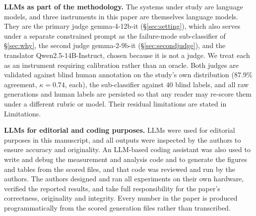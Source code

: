 \documentclass[conference,compsoc,letterpaper]{IEEEtran}
\begin{document}
\textbf{LLMs as part of the methodology.} The systems under study are language models, and three instruments in this paper are themselves language models. They are the primary judge gemma-4-12b-it (\S\ref{sec:setting}), which also serves under a separate constrained prompt as the failure-mode sub-classifier of \S\ref{sec:why}, the second judge gemma-2-9b-it (\S\ref{sec:secondjudge}), and the translator Qwen2.5-14B-Instruct, chosen because it is not a judge. We treat each as an instrument requiring calibration rather than an oracle. Both judges are validated against blind human annotation on the study's own distribution ($87.9\%$ agreement, $\kappa = 0.74$, each), the sub-classifier against $40$ blind labels, and all raw generations and human labels are persisted so that any reader may re-score them under a different rubric or model. Their residual limitations are stated in Limitations.

\textbf{LLMs for editorial and coding purposes.} LLMs were used for editorial purposes in this manuscript, and all outputs were inspected by the authors to ensure accuracy and originality. An LLM-based coding assistant was also used to write and debug the measurement and analysis code and to generate the figures and tables from the scored files, and that code was reviewed and run by the authors. The authors designed and ran all experiments on their own hardware, verified the reported results, and take full responsibility for the paper's correctness, originality and integrity. Every number in the paper is produced programmatically from the scored generation files rather than transcribed.
\end{document}

